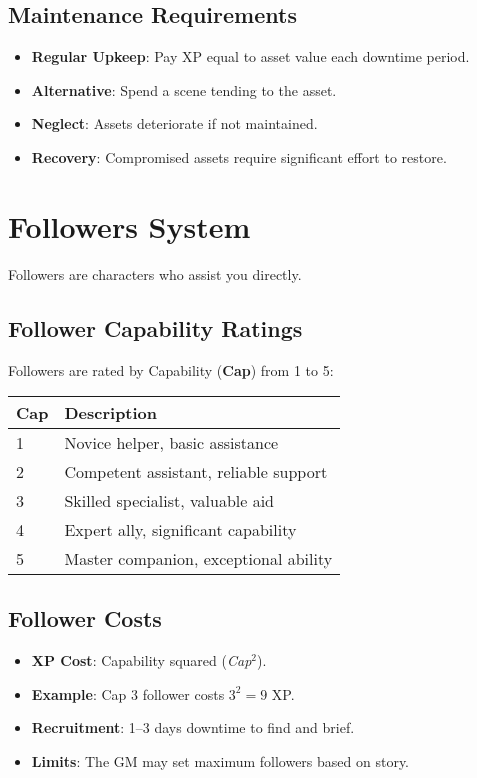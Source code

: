 \begin{multicols}{2}
\subsection*{Maintenance Requirements}
\begin{itemize}
\item \textbf{Regular Upkeep}: Pay XP equal to asset value each downtime period.
\item \textbf{Alternative}: Spend a scene tending to the asset.
\item \textbf{Neglect}: Assets deteriorate if not maintained.
\item \textbf{Recovery}: Compromised assets require significant effort to restore.
\end{itemize}

\section{Followers System}

Followers are characters who assist you directly.

\subsection*{Follower Capability Ratings}
Followers are rated by Capability (\textbf{Cap}) from 1 to 5:
\begin{center}
\small
\begin{tabular}{ll}
\toprule
\textbf{Cap} & \textbf{Description} \\
\midrule
1 & Novice helper, basic assistance \\
2 & Competent assistant, reliable support \\
3 & Skilled specialist, valuable aid \\
4 & Expert ally, significant capability \\
5 & Master companion, exceptional ability \\
\bottomrule
\end{tabular}
\end{center}

\subsection*{Follower Costs}
\begin{itemize}
\item \textbf{XP Cost}: Capability squared (\emph{Cap}$^2$).
\item \textbf{Example}: Cap 3 follower costs $3^2=9$ XP.
\item \textbf{Recruitment}: 1--3 days downtime to find and brief.
\item \textbf{Limits}: The GM may set maximum followers based on story.
\end{itemize}


\end{multicols}
